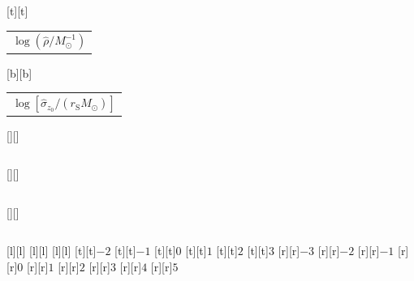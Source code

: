%    
%
%
\begin{psfrags}%
\psfragscanon%
%
[t][t]{\color[rgb]{0,0,0}\setlength{\tabcolsep}{0pt}\begin{tabular}{c}{\Large$\log\left(\hat{\rho}/M_\odot^{-1}\right)$}\end{tabular}}%
[b][b]{\color[rgb]{0,0,0}\setlength{\tabcolsep}{0pt}\begin{tabular}{c}{\Large$\log\left[\hat{\sigma}_{z_0}/\left(r_\mathrm{S} M_\odot\right)\right]$}\end{tabular}}%
[][]{\color[rgb]{0,0,0}\setlength{\tabcolsep}{0pt}\begin{tabular}{c} \end{tabular}}%
[][]{\color[rgb]{0,0,0}\setlength{\tabcolsep}{0pt}\begin{tabular}{c} \end{tabular}}%
[][]{\color[rgb]{0,0,0}\setlength{\tabcolsep}{0pt}\begin{tabular}{c} \end{tabular}}%
[l][l]{\color[rgb]{0,0,0}{\large$\iota = \pi/12$}}%
[l][l]{\color[rgb]{0,0,0}{\large$\iota = \pi/4$}}%
[l][l]{\color[rgb]{0,0,0}{\large$\iota = 5\pi/12$}}%
%
[t][t]{$-2$}%
[t][t]{$-1$}%
[t][t]{$0$}%
[t][t]{$1$}%
[t][t]{$2$}%
[t][t]{$3$}%
%
[r][r]{$-3$}%
[r][r]{$-2$}%
[r][r]{$-1$}%
[r][r]{$0$}%
[r][r]{$1$}%
[r][r]{$2$}%
[r][r]{$3$}%
[r][r]{$4$}%
[r][r]{$5$}%
%
%
\end{psfrags}%
%
